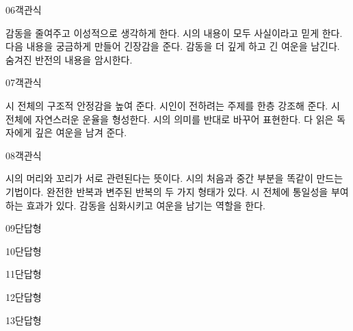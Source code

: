 \documentclass[fs85,seriesRus]{korfarm-base}
\begin{document}
\begin{kfQBlock}{06}{객관식}
\begin{kfChoices}
\kfChoice 감동을 줄여주고 이성적으로 생각하게 한다.
\kfChoice 시의 내용이 모두 사실이라고 믿게 한다.
\kfChoice 다음 내용을 궁금하게 만들어 긴장감을 준다.
\kfChoice 감동을 더 깊게 하고 긴 여운을 남긴다.
\kfChoice 숨겨진 반전의 내용을 암시한다.
\end{kfChoices}
\end{kfQBlock}
\begin{kfQBlock}{07}{객관식}
\begin{kfChoices}
\kfChoice 시 전체의 구조적 안정감을 높여 준다.
\kfChoice 시인이 전하려는 주제를 한층 강조해 준다.
\kfChoice 시 전체에 자연스러운 운율을 형성한다.
\kfChoice 시의 의미를 반대로 바꾸어 표현한다.
\kfChoice 다 읽은 독자에게 깊은 여운을 남겨 준다.
\end{kfChoices}
\end{kfQBlock}
\begin{kfQBlock}{08}{객관식}
\begin{kfChoices}
\kfChoice 시의 머리와 꼬리가 서로 관련된다는 뜻이다.
\kfChoice 시의 처음과 중간 부분을 똑같이 만드는 기법이다.
\kfChoice 완전한 반복과 변주된 반복의 두 가지 형태가 있다.
\kfChoice 시 전체에 통일성을 부여하는 효과가 있다.
\kfChoice 감동을 심화시키고 여운을 남기는 역할을 한다.
\end{kfChoices}
\end{kfQBlock}
\begin{kfQBlock}{09}{단답형}
\end{kfQBlock}
\begin{kfQBlock}{10}{단답형}
\end{kfQBlock}
\begin{kfQBlock}{11}{단답형}
\end{kfQBlock}
\begin{kfQBlock}{12}{단답형}
\end{kfQBlock}
\begin{kfQBlock}{13}{단답형}
\end{kfQBlock}
\end{document}
